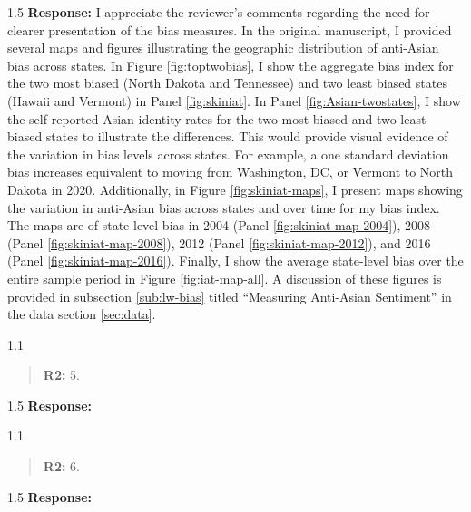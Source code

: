 \documentclass[12pt,english]{article}
\newcommand{\rrquote}{1.1}
\newcommand{\rrxspc}{1.5}
\begin{document}
\begin{refsection}
        \begin{spacing}{\rrxspc}
            \textbf{Response:} I appreciate the reviewer's comments regarding the need for clearer presentation of the bias measures. In the original manuscript, I provided several maps and figures illustrating the geographic distribution of anti-Asian bias across states. In Figure \ref{fig:toptwobias}, I show the aggregate bias index for the two most biased (North Dakota and Tennessee) and two least biased states (Hawaii and Vermont) in Panel \ref{fig:skiniat}. In Panel \ref{fig:Asian-twostates}, I show the self-reported Asian identity rates for the two most biased and two least biased states to illustrate the differences. This would provide visual evidence of the variation in bias levels across states. For example, a one standard deviation bias increases equivalent to moving from Washington, DC, or Vermont to North Dakota in 2020. Additionally, in Figure \ref{fig:skiniat-maps}, I present maps showing the variation in anti-Asian bias across states and over time for my bias index. The maps are of state-level bias in 2004 (Panel \ref{fig:skiniat-map-2004}), 2008 (Panel \ref{fig:skiniat-map-2008}), 2012 (Panel \ref{fig:skiniat-map-2012}), and 2016 (Panel \ref{fig:skiniat-map-2016}). Finally, I show the average state-level bias over the entire sample period in Figure \ref{fig:iat-map-all}. A discussion of these figures is provided in subsection \ref{sub:lw-bias} titled ``Measuring Anti-Asian Sentiment'' in the data section \ref{sec:data}.
    \end{spacing}

    \begin{spacing}{\rrquote}
        \begin{quotation}
        \textbf{R2: } 5. 
        \end{quotation}
        \end{spacing}
        
        \begin{spacing}{\rrxspc}
            \textbf{Response:} 
    \end{spacing}

    \begin{spacing}{\rrquote}
        \begin{quotation}
        \textbf{R2: } 6. 
        \end{quotation}
        \end{spacing}
        
        \begin{spacing}{\rrxspc}
           \textbf{Response:}  
    \end{spacing}


\end{refsection}
\end{document}
